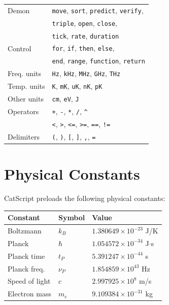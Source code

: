 \documentclass[twocolumn,10pt]{article}
\begin{document}
\begin{table}[H]
\begin{tabular}{@{}ll@{}}
\midrule
Demon & \texttt{move}, \texttt{sort}, \texttt{predict}, \texttt{verify}, \\
      & \texttt{triple}, \texttt{open}, \texttt{close}, \\
      & \texttt{tick}, \texttt{rate}, \texttt{duration} \\
\midrule
Control & \texttt{for}, \texttt{if}, \texttt{then}, \texttt{else}, \\
        & \texttt{end}, \texttt{range}, \texttt{function}, \texttt{return} \\
\midrule
Freq. units & \texttt{Hz}, \texttt{kHz}, \texttt{MHz}, \texttt{GHz}, \texttt{THz} \\
Temp. units & \texttt{K}, \texttt{mK}, \texttt{uK}, \texttt{nK}, \texttt{pK} \\
Other units & \texttt{cm}, \texttt{eV}, \texttt{J} \\
\midrule
Operators & \texttt{+}, \texttt{-}, \texttt{*}, \texttt{/}, \texttt{\^{}} \\
          & \texttt{<}, \texttt{>}, \texttt{<=}, \texttt{>=}, \texttt{==}, \texttt{!=} \\
\midrule
Delimiters & \texttt{(}, \texttt{)}, \texttt{[}, \texttt{]}, \texttt{,}, \texttt{=} \\
\bottomrule
\end{tabular}
\end{table}

\section{Physical Constants}

CatScript preloads the following physical constants:

\begin{table}[H]
\centering
\small
\begin{tabular}{@{}lll@{}}
\toprule
Constant & Symbol & Value \\
\midrule
Boltzmann & $k_B$ & $1.380649 \times 10^{-23}$ J/K \\
Planck & $\hbar$ & $1.054572 \times 10^{-34}$ J$\cdot$s \\
Planck time & $t_P$ & $5.391247 \times 10^{-44}$ s \\
Planck freq. & $\nu_P$ & $1.854859 \times 10^{43}$ Hz \\
Speed of light & $c$ & $2.997925 \times 10^{8}$ m/s \\
Electron mass & $m_e$ & $9.109384 \times 10^{-31}$ kg \\
\bottomrule
\end{tabular}
\end{table}
\end{document}
